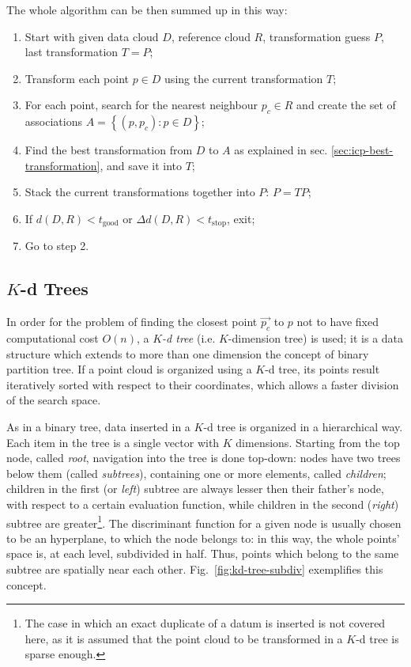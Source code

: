 The whole algorithm can be then summed up in this way:
\begin{enumerate}
\item{Start with given data cloud $D$, reference cloud $R$, transformation
  guess $P$, last transformation $T=P$;}
\item{Transform each point $p \in D$ using the current transformation $T$;}
\item{For each point, search for the nearest neighbour $p_c \in R$ and create
  the set of associations $A=\left\{(p,p_c) : p \in D \right\}$;}
\item{Find the best transformation from $D$ to $A$ as explained in sec.
  \ref{sec:icp-best-transformation}, and save it into $T$;}
\item{Stack the current transformations together into $P$: $P=TP$;}
\item{If $d(D,R)<t_{\text{good}}$ or $\Delta d(D,R)<t_{\text{stop}}$, exit;}
\item{Go to step 2.}
\end{enumerate}
\subsection{$K$-d Trees} \label{kdtree}
In order for the problem of finding the closest point $\vec{p_c}$ to $p$ not to
have fixed computational cost $O(n)$, a \emph{$K$-d tree} (i.e.
$K$-dimension tree) is used; it is
a data structure which extends to more than one dimension the concept of binary
partition tree. If a point cloud is organized using a $K$-d tree, its points
result iteratively sorted with respect to their coordinates, which allows a
faster division of the search space.

As in a binary tree, data inserted in a $K$-d tree is organized in a
hierarchical way. Each item in the tree is a single vector with $K$ dimensions.
Starting from the top node, called \emph{root}, navigation into the tree is done
top-down: nodes have two trees below them (called \emph{subtrees}), containing one
or more elements, called \emph{children}; children in the first (or \emph{left})
subtree are always lesser then their father's node, with respect to a certain
evaluation function, while children in the second (\emph{right}) subtree are
greater\footnote{The case in which an exact duplicate of a datum is inserted is
 not covered here, as it is assumed that the point cloud to be transformed in a
 $K$-d tree is sparse enough.}. The discriminant function for a given node is usually chosen to be an hyperplane, to
which the node belongs to: in
this way, the whole points' space is, at each level, subdivided in half. Thus,
points which belong to the same subtree are spatially near each other.
Fig.~\ref{fig:kd-tree-subdiv} exemplifies this concept.


